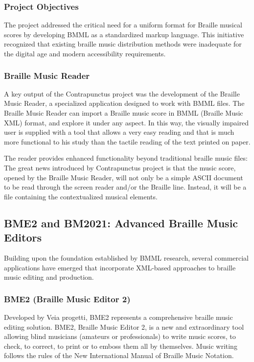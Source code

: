 \subsubsection{Project Objectives}
The project addressed the critical need for a uniform format for Braille musical scores by developing BMML as a standardized markup language. This initiative recognized that existing braille music distribution methods were inadequate for the digital age and modern accessibility requirements.

\subsubsection{Braille Music Reader}
A key output of the Contrapunctus project was the development of the Braille Music Reader, a specialized application designed to work with BMML files. The Braille Music Reader can import a Braille music score in BMML (Braille Music XML) format, and explore it under any aspect. In this way, the visually impaired user is supplied with a tool that allows a very easy reading and that is much more functional to his study than the tactile reading of the text printed on paper.

The reader provides enhanced functionality beyond traditional braille music files: The great news introduced by Contrapunctus project is that the music score, opened by the Braille Music Reader, will not only be a simple ASCII document to be read through the screen reader and/or the Braille line. Instead, it will be a file containing the contextualized musical elements.

\subsection{BME2 and BM2021: Advanced Braille Music Editors}

Building upon the foundation established by BMML research, several commercial applications have emerged that incorporate XML-based approaches to braille music editing and production.

\subsubsection{BME2 (Braille Music Editor 2)}
Developed by Veia progetti, BME2 represents a comprehensive braille music editing solution. BME2, Braille Music Editor 2, is a new and extraordinary tool allowing blind musicians (amateurs or professionals) to write music scores, to check, to correct, to print or to emboss them all by themselves. Music writing follows the rules of the New International Manual of Braille Music Notation.

